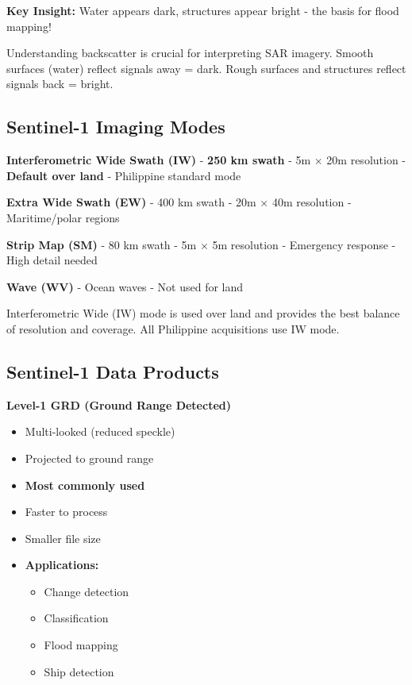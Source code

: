 \documentclass[
  letterpaper,
  DIV=11,
  numbers=noendperiod]{scrartcl}
\providecommand{\tightlist}{%
  \setlength{\itemsep}{0pt}\setlength{\parskip}{0pt}}
\begin{document}
\textbf{Key Insight:} Water appears dark, structures appear bright - the
basis for flood mapping!

Understanding backscatter is crucial for interpreting SAR imagery.
Smooth surfaces (water) reflect signals away = dark. Rough surfaces and
structures reflect signals back = bright.

\subsection{Sentinel-1 Imaging Modes}\label{sentinel-1-imaging-modes}

\textbf{Interferometric Wide Swath (IW)} - \textbf{250 km swath} - 5m ×
20m resolution - \textbf{Default over land} - Philippine standard mode

\textbf{Extra Wide Swath (EW)} - 400 km swath - 20m × 40m resolution -
Maritime/polar regions

\textbf{Strip Map (SM)} - 80 km swath - 5m × 5m resolution - Emergency
response - High detail needed

\textbf{Wave (WV)} - Ocean waves - Not used for land

Interferometric Wide (IW) mode is used over land and provides the best
balance of resolution and coverage. All Philippine acquisitions use IW
mode.

\subsection{Sentinel-1 Data Products}\label{sentinel-1-data-products}

\textbf{Level-1 GRD (Ground Range Detected)}

\begin{itemize}
\tightlist
\item
  Multi-looked (reduced speckle)
\item
  Projected to ground range
\item
  \textbf{Most commonly used}
\item
  Faster to process
\item
  Smaller file size
\item
  \textbf{Applications:}

  \begin{itemize}
  \tightlist
  \item
    Change detection
  \item
    Classification
  \item
    Flood mapping
  \item
    Ship detection
  \end{itemize}
\end{itemize}
\end{document}

